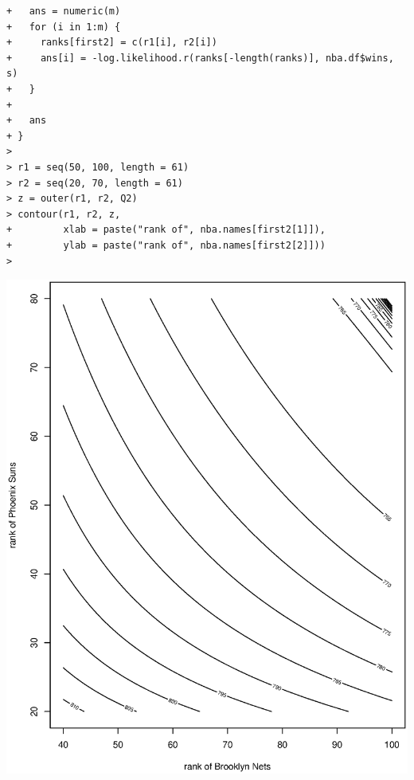 \documentclass[11pt]{report}
\theoremstyle{definition}
\theoremstyle{remark}
\begin{document}
\begin{enumerate}
\begin{enumerate}
\begin{verbatim}
+   ans = numeric(m)
+   for (i in 1:m) {
+     ranks[first2] = c(r1[i], r2[i])
+     ans[i] = -log.likelihood.r(ranks[-length(ranks)], nba.df$wins, s)
+   }
+   
+   ans
+ }
> 
> r1 = seq(50, 100, length = 61)
> r2 = seq(20, 70, length = 61)
> z = outer(r1, r2, Q2)
> contour(r1, r2, z,
+         xlab = paste("rank of", nba.names[first2[1]]),
+         ylab = paste("rank of", nba.names[first2[2]]))
> \end{verbatim}
    \includegraphics[width=\textwidth]{a2_contour.eps}
    \end{enumerate}

\end{enumerate}
\end{document}
